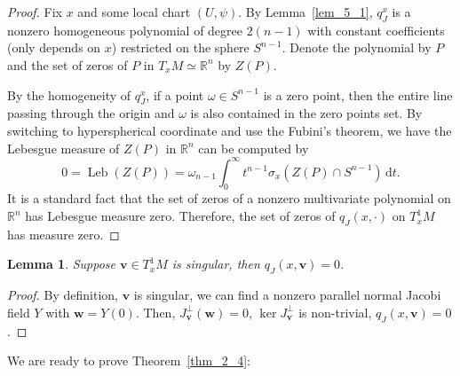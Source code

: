 \documentclass[reqno,11pt]{article}
\newtheorem{lemma}{Lemma}[section]
\theoremstyle{definition}
\theoremstyle{remark}
\numberwithin{equation}{section}
\begin{document}
\begin{proof}
	Fix $x$ and some local chart $(U,\psi)$. By Lemma~\ref{lem_5_1}, $q_{J}^{x}$ is a nonzero homogeneous polynomial of degree $2(n-1)$ with constant coefficients (only depends on $x$) restricted on the sphere $S^{n-1}$. Denote the polynomial by $P$ and the set of zeros of $P$ in $T_{x}M\simeq \mathbb{R}^{n}$ by $Z(P)$.

	By the homogeneity of $q_{J}^{x}$, if a point $\omega\in S^{n-1}$ is a zero point, then the entire line passing through the origin and $\omega$ is also contained in the zero points set. By switching to hyperspherical coordinate and use the Fubini's theorem, we have the Lebesgue measure of $Z(P)$ in $\mathbb{R}^n$ can be computed by
	\begin{displaymath}
		0=\operatorname{Leb}(Z(P))=\omega_{n-1}\int_0^{\infty} t^{n-1}\sigma_x(Z(P)\cap S^{n-1})\,\mathrm{d}t.
	\end{displaymath}
	It is a standard fact that the set of zeros of a nonzero multivariate polynomial on $\mathbb{R}^{n}$ has Lebesgue measure zero. Therefore, the set of zeros of $q_{J}(x,\cdot)$ on $T^{1}_{x}M$ has measure zero.
\end{proof}

\begin{lemma}\label{lem_5_4}
	Suppose $\bm{v}\in T^{1}_{x}M$ is singular, then $q_J(x,\bm{v})=0$.
\end{lemma}

\begin{proof}
	By definition, $\bm{v}$ is singular, we can find a nonzero parallel normal Jacobi field $Y$ with $\bm{w}=Y(0)$. Then, $J^{\perp}_{\bm{v}}(\bm{w})=0$, $\ker J^{\perp}_{\bm{v}}$ is non-trivial, $q_J(x,\bm{v})=0$.
\end{proof}

We are ready to prove Theorem~\ref{thm_2_4}:

\manifold*
\end{document}
